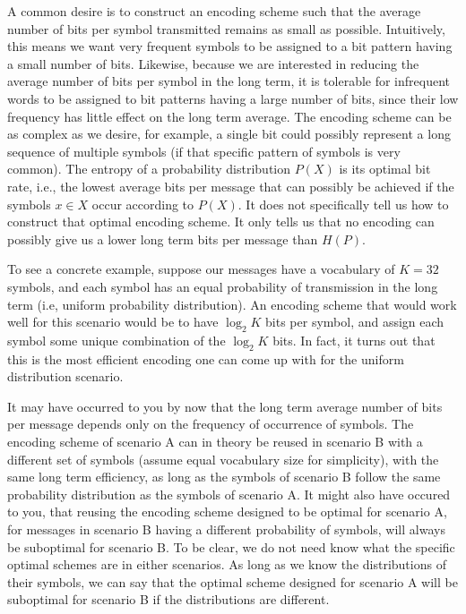 \documentclass[a4paper]{article}
\begin{document}
A common desire is to construct an encoding scheme such that 
the average number of bits per symbol transmitted remains as 
small as possible. Intuitively, this means we want very 
frequent symbols to be assigned to a bit pattern having a 
small number of bits. Likewise, because we are interested in 
reducing the average number of bits per symbol in the long 
term, it is tolerable for infrequent words to be assigned to 
bit patterns having a large number of bits, since their low 
frequency has little effect on the long term average. The 
encoding scheme can be as complex as we desire, for example, 
a single bit could possibly represent a long sequence of 
multiple symbols (if that specific pattern of symbols is very 
common). The entropy of a probability distribution $P(X)$ is 
its optimal bit rate, i.e., the lowest average bits per 
message that can possibly be achieved if the symbols $x \in X$ 
occur according to $P(X)$. It does not specifically tell us 
how to construct that optimal encoding scheme. It only tells 
us that no encoding can possibly give us a lower long term 
bits per message than $H(P)$.

To see a concrete example, suppose our messages have a 
vocabulary of $K = 32$ symbols, and each symbol has an equal 
probability of transmission in the long term (i.e, uniform 
probability distribution). An encoding scheme that would 
work well for this scenario would be to have $\log_2 K$ bits 
per symbol, and assign each symbol some unique combination 
of the $\log_2 K$ bits. In fact, it turns out that this is the 
most efficient encoding one can come up with for the uniform 
distribution scenario.

It may have occurred to you by now that the long term average 
number of bits per message depends only on the frequency of 
occurrence of symbols. The encoding scheme of scenario A can 
in theory be reused in scenario B with a different set of 
symbols (assume equal vocabulary size for simplicity), 
with the same long term efficiency, as long as the symbols 
of scenario B follow the same probability distribution as the 
symbols of scenario A. It might also have occured to you, 
that reusing the encoding scheme designed to be optimal for 
scenario A, for messages in scenario B having a different 
probability of symbols, will always be suboptimal for 
scenario B. To be clear, we do not need know what the 
specific optimal schemes are in either scenarios. As long 
as we know the distributions of their symbols, we can say 
that the optimal scheme designed for scenario A will be 
suboptimal for scenario B if the distributions are different.
\end{document}
